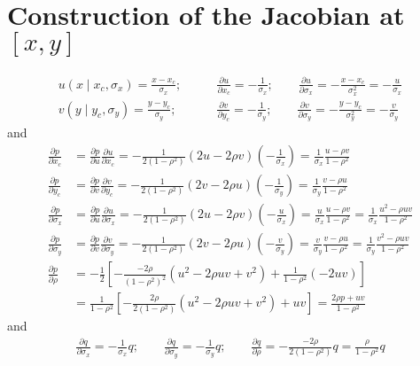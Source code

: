 \documentclass[11pt]{article} %
\begin{document}
\section{Construction of the Jacobian at $\left[x, y\right]$}
\begin{align*}
u\left(x\mid x_c, \sigma_x\right) = \frac{x-x_c}{\sigma_x}; \qquad &\frac{\partial u}{\partial x_c} = -\frac{1}{\sigma_x}; \qquad \frac{\partial u}{\partial \sigma_x} = -\frac{x-x_c}{\sigma_x^2} = -\frac{u}{\sigma_x}\\ 
v\left(y\mid y_c, \sigma_y\right) = \frac{y-y_c}{\sigma_y}; \qquad &\frac{\partial v}{\partial y_c} = -\frac{1}{\sigma_y}; \qquad \frac{\partial v}{\partial \sigma_y} = -\frac{y-y_c}{\sigma_y^2} = -\frac{v}{\sigma_y}
\end{align*}
and
\begin{align*}
\frac{\partial p}{\partial x_c} &= \frac{\partial p}{\partial u} \frac{\partial u}{\partial x_c} = -\frac{1}{2\left(1-\rho^2\right)} \left(2u -2\rho v\right) \left(-\frac{1}{\sigma_x}\right) =  \frac{1}{\sigma_x}\frac{u -\rho v}{1-\rho^2}\\
\frac{\partial p}{\partial y_c} &= \frac{\partial p}{\partial v} \frac{\partial v}{\partial y_c} = -\frac{1}{2\left(1-\rho^2\right)} \left(2v -2\rho u\right) \left(-\frac{1}{\sigma_y}\right) = \frac{1}{\sigma_y}\frac{v -\rho u}{1-\rho^2} \\
\frac{\partial p}{\partial \sigma_x} &= \frac{\partial p}{\partial u} \frac{\partial u}{\partial \sigma_x} = -\frac{1}{2\left(1-\rho^2\right)} \left(2u -2\rho v\right) \left(-\frac{u}{\sigma_x}\right) =  \frac{u}{\sigma_x}\frac{u -\rho v}{1-\rho^2}=  \frac{1}{\sigma_x}\frac{u^2 -\rho uv}{1-\rho^2}\\
\frac{\partial p}{\partial \sigma_y} &= \frac{\partial p}{\partial v} \frac{\partial v}{\partial \sigma_y} = -\frac{1}{2\left(1-\rho^2\right)} \left(2v -2\rho u\right) \left(-\frac{v}{\sigma_y}\right) =  \frac{v}{\sigma_y}\frac{v -\rho u}{1-\rho^2}=  \frac{1}{\sigma_y}\frac{v^2 -\rho uv}{1-\rho^2}\\
\frac{\partial p}{\partial \rho} &= -\frac{1}{2}\left[-\frac{-2\rho}{\left(1-\rho^2\right)^2}\left(u^2-2\rho uv + v^2\right) + \frac{1}{1-\rho^2}\left(-2uv\right)\right]\\
&= \frac{1}{1-\rho^2}\left[-\frac{2\rho}{2\left(1-\rho^2\right)}\left(u^2-2\rho uv + v^2\right) + uv\right] = \frac{2\rho p + uv}{1-\rho^2}
\end{align*}
and
\begin{align*}
\frac{\partial q}{\partial \sigma_x} = -\frac{1}{\sigma_x}q; \qquad \frac{\partial q}{\partial \sigma_y} = -\frac{1}{\sigma_y}q; \qquad \frac{\partial q}{\partial \rho} = -\frac{-2\rho}{2\left(1-\rho^2\right)}q = \frac{\rho}{1-\rho^2}q\\
\end{align*}
\end{document}
